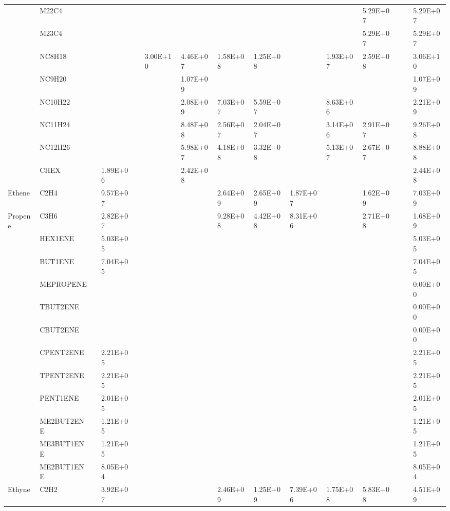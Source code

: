 \begin{longtable}{lllllllllllllll}
	 & M22C4 &  &  &  &  &  &  &  &  &  & 5.29E+07 &  &  & 5.29E+07 \\
	 & M23C4 &  &  &  &  &  &  &  &  &  & 5.29E+07 &  &  & 5.29E+07 \\
	 & NC8H18 &  &  &  & 3.00E+10 & 4.46E+07 & 1.58E+08 & 1.25E+08 &  & 1.93E+07 & 2.59E+08 &  &  & 3.06E+10 \\
	 & NC9H20 &  &  &  &  & 1.07E+09 &  &  &  &  &  &  &  & 1.07E+09 \\
	 & NC10H22 &  &  &  &  & 2.08E+09 & 7.03E+07 & 5.59E+07 &  & 8.63E+06 &  &  &  & 2.21E+09 \\
	 & NC11H24 &  &  &  &  & 8.48E+08 & 2.56E+07 & 2.04E+07 &  & 3.14E+06 & 2.91E+07 &  &  & 9.26E+08 \\
	 & NC12H26 &  &  &  &  & 5.98E+07 & 4.18E+08 & 3.32E+08 &  & 5.13E+07 & 2.67E+07 &  &  & 8.88E+08 \\
	 & CHEX &  & 1.89E+06 &  &  & 2.42E+08 &  &  &  &  &  &  &  & 2.44E+08 \\
	\hline Ethene & C2H4 &  & 9.57E+07 &  &  &  & 2.64E+09 & 2.65E+09 & 1.87E+07 &  & 1.62E+09 &  &  & 7.03E+09 \\ \hline
	Propene & C3H6 &  & 2.82E+07 &  &  &  & 9.28E+08 & 4.42E+08 & 8.31E+06 &  & 2.71E+08 &  &  & 1.68E+09 \\
	\hline \parbox[t]{2mm}{} & HEX1ENE &  & 5.03E+05 &  &  &  &  &  &  &  &  &  &  & 5.03E+05 \\
	 & BUT1ENE &  & 7.04E+05 &  &  &  &  &  &  &  &  &  &  & 7.04E+05 \\
	 & MEPROPENE &  &  &  &  &  &  &  &  &  &  &  &  & 0.00E+00 \\
	 & TBUT2ENE &  &  &  &  &  &  &  &  &  &  &  &  & 0.00E+00 \\
	 & CBUT2ENE &  &  &  &  &  &  &  &  &  &  &  &  & 0.00E+00 \\
	 & CPENT2ENE &  & 2.21E+05 &  &  &  &  &  &  &  &  &  &  & 2.21E+05 \\
	 & TPENT2ENE &  & 2.21E+05 &  &  &  &  &  &  &  &  &  &  & 2.21E+05 \\
	 & PENT1ENE &  & 2.01E+05 &  &  &  &  &  &  &  &  &  &  & 2.01E+05 \\
	 & ME2BUT2ENE &  & 1.21E+05 &  &  &  &  &  &  &  &  &  &  & 1.21E+05 \\
	 & ME3BUT1ENE &  & 1.21E+05 &  &  &  &  &  &  &  &  &  &  & 1.21E+05 \\
	 & ME2BUT1ENE &  & 8.05E+04 &  &  &  &  &  &  &  &  &  &  & 8.05E+04 \\
	\hline Ethyne & C2H2 &  & 3.92E+07 &  &  &  & 2.46E+09 & 1.25E+09 & 7.39E+06 & 1.75E+08 & 5.83E+08 &  &  & 4.51E+09 \\ \hline

\end{longtable}
